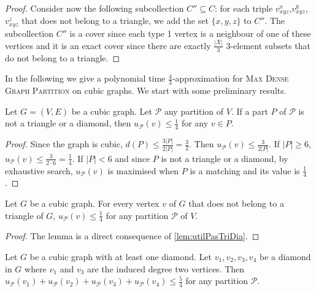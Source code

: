 \documentclass[a4paper,USenglish,cleveref, autoref]{lipics-v2021}
\newcommand\MDGP{\textsc{Max Dense Graph Partition}}
\begin{document}
\begin{proof}
Consider now the following subcollection $C''\subseteq C$: for each triple $v^x_{xyz}$,$v^y_{xyz}$,$v^z_{xyz}$ that does not belong to a triangle, we add the set $\{x,y,z\}$ to $C''$. The subcollection $C''$ is a cover since each type 1 vertex is a neighbour of one of these vertices and it is an exact cover  since there are exactly  $\frac{|X|}{3}$ 3-element subsets that do not belong to a triangle.
\end{proof}
 
 

In the following we give a polynomial time  $\frac{4}{3}$-approximation for \MDGP{} on cubic graphs. We start with some preliminary results. 
\begin{lemma}
\label{lem:utilPasTriDia}
Let $G=(V,E)$ be a cubic graph. Let $\mathcal{P}$ any partition of $V$. 
If a part $P$ of $\mathcal P$ is not a triangle or a diamond, then $u_\mathcal{P}(v) \leq \frac{1}{4}$ for any $v\in P$.
\end{lemma}
\begin{proof}
Since the graph is cubic, $d(P) \leq \frac{3|P|}{2|P|} = \frac{3}{2}$. Then $u_{\mathcal{P}}(v) \leq \frac{3}{2|P|}$. If $|P| \geq 6$, $u_{\mathcal{P}}(v) \leq \frac{3}{2 \cdot 6} = \frac{1}{4}$. If $|P| < 6$ and since $P$ is not a triangle or a diamond, by exhaustive search,  $u_{\mathcal{P}}(v)$ is maximised when $P$ is a matching and its value is $\frac{1}{4}$.
\end{proof}
\begin{lemma}
\label{lem:UtilMatchCubique}
Let $G$ be a cubic graph. For every vertex $v$ of $G$ that does not belong to a triangle of $G$, $u_{\mathcal{P}}(v) \leq \frac{1}{4}$ for any partition $\mathcal{P}$ of $V$.
 \end{lemma}
 \begin{proof}
 The lemma is a direct consequence of \autoref{lem:utilPasTriDia}.
 \end{proof}

\begin{lemma}
\label{lem:UtilDiamCubique}
Let $G$ be a cubic graph with at least one diamond. Let $v_1,v_2,v_3,v_4$ be a diamond in $G$ where $v_1$ and $v_3$ are the induced degree two vertices. Then $u_{\mathcal{P}}(v_1) + u_{\mathcal{P}}(v_2) + u_{\mathcal{P}}(v_3) + u_{\mathcal{P}}(v_4) \leq \frac{5}{4}$ for any partition $\mathcal{P}$.
\end{lemma}
\end{document}
